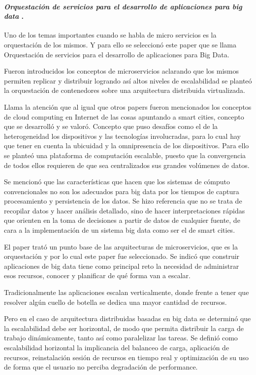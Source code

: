 
\paragraph{
    \textbf{\emph{Orquestación de servicios para el desarrollo de aplicaciones para big data}}
    \cite{orquestacion}.
    }

Uno de los temas importantes cuando se habla de micro servicios es la orquestación de los mismos. Y para ello se seleccionó este paper  que se llama Orquestación de servicios para el desarrollo de aplicaciones para Big Data. 


Fueron introducidos los conceptos de microservicios aclarando que los mismos permiten replicar y distribuir logrando así altos niveles de escalabilidad se planteó la orquestación de contenedores sobre una arquitectura distribuida virtualizada. 

Llama la atención que al igual que otros papers fueron mencionados los conceptos de cloud computing en Internet de las cosas apuntando a smart cities, concepto que se desarrolló y se valoró. Concepto que puso desafíos como el de la heterogeneidad los dispositivos y las tecnologías involucradas, para lo cual hay que tener en cuenta la ubicuidad y la omnipresencia de los dispositivos. 
Para ello se planteó una plataforma de computación escalable, puesto que la convergencia de todos ellos requieren de que sea centralizados sus grandes  volúmenes de datos. 

Se mencionó que las características que hacen que los sistemas de cómputo convencionales no son los adecuados para big data por los tiempos de captura procesamiento y persistencia de los datos. Se hizo referencia que no se trata de recopilar datos y hacer análisis detallado, sino de hacer interpretaciones rápidas que orienten en la toma de decisiones a partir de datos de cualquier fuente, de cara a la implementación de un sistema big data como ser el de smart cities.


El paper trató un punto base de las arquitecturas de microservicios, que es la orquestación y por lo cual este paper fue seleccionado. Se indicó que construir aplicaciones de big data tiene como principal reto la necesidad de administrar esos recursos, conocer y planificar de qué forma van a escalar. 

Tradicionalmente las aplicaciones escalan verticalmente, donde frente a tener que resolver algún cuello de botella se dedica una mayor cantidad de recursos. 

Pero en el caso de arquitectura distribuidas basadas en big data se determinó que la escalabilidad debe ser horizontal, de modo que permita distribuir la carga de trabajo dinámicamente, tanto así como paralelizar las tareas. 
Se definió como escalabilidad horizontal la implicancia del balanceo de carga, aplicación de recursos, reinstalación sesión de recursos en tiempo real y optimización de su uso de forma que el usuario no perciba degradación de performance. 


